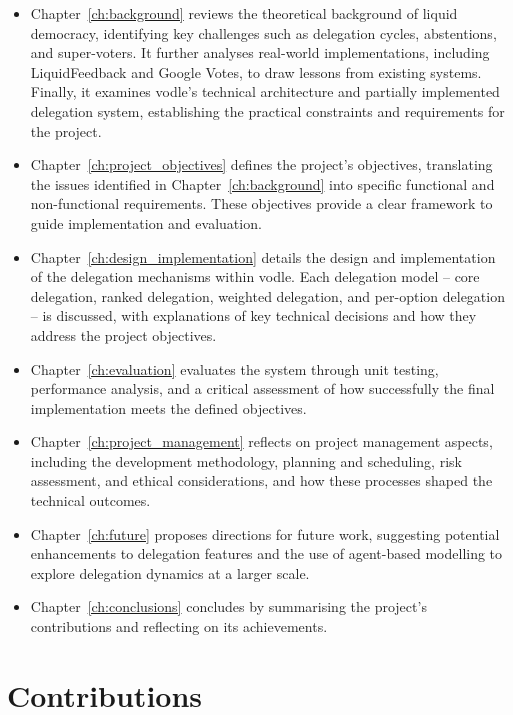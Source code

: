 \begin{itemize}
    \item Chapter~\ref{ch:background} reviews the theoretical background of liquid democracy, identifying key challenges such as delegation cycles, abstentions, and super-voters. It further analyses real-world implementations, including LiquidFeedback and Google Votes, to draw lessons from existing systems. Finally, it examines vodle's technical architecture and partially implemented delegation system, establishing the practical constraints and requirements for the project.

    \item Chapter~\ref{ch:project_objectives} defines the project's objectives, translating the issues identified in Chapter~\ref{ch:background} into specific functional and non-functional requirements. These objectives provide a clear framework to guide implementation and evaluation.

    \item Chapter~\ref{ch:design_implementation} details the design and implementation of the delegation mechanisms within vodle. Each delegation model -- core delegation, ranked delegation, weighted delegation, and per-option delegation -- is discussed, with explanations of key technical decisions and how they address the project objectives.

    \item Chapter~\ref{ch:evaluation} evaluates the system through unit testing, performance analysis, and a critical assessment of how successfully the final implementation meets the defined objectives.

    \item Chapter~\ref{ch:project_management} reflects on project management aspects, including the development methodology, planning and scheduling, risk assessment, and ethical considerations, and how these processes shaped the technical outcomes.

    \item Chapter~\ref{ch:future} proposes directions for future work, suggesting potential enhancements to delegation features and the use of agent-based modelling to explore delegation dynamics at a larger scale.

    \item Chapter~\ref{ch:conclusions} concludes by summarising the project's contributions and reflecting on its achievements.
\end{itemize}

\section{Contributions}

